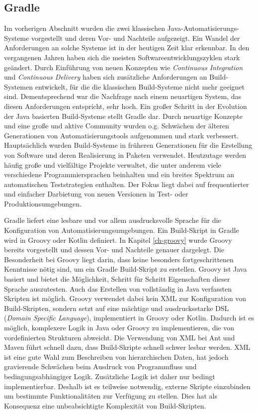 \subsection{Gradle}
Im vorherigen Abschnitt wurden die zwei klassischen Java-Automatisierungs-Systeme vorgestellt und deren Vor- und Nachteile aufgezeigt.
Ein Wandel der Anforderungen an solche Systeme ist in der heutigen Zeit klar erkennbar.
In den vergangenen Jahren haben sich die meisten Softwareentwicklungszyklen stark geändert. 
Durch Einführung von neuen Konzepten wie \textit{Continuous Integration} und \textit{Continuous Delivery} haben sich zusätzliche Anforderungen an Build-Systemen entwickelt, für die die klassischen Build-Systeme nicht mehr geeignet sind. 
Dementsprechend war die Nachfrage nach einem neuartigen System, das diesen Anforderungen entspricht, sehr hoch. 
Ein großer Schritt in der Evolution der Java basierten Build-Systeme stellt Gradle dar.
Durch neuartige Konzepte und eine große und aktive Community wurden o.g. Schwächen der älteren Generationen von Automatisierungstools aufgenommen und stark verbessert.
Hauptsächlich wurden Build-Systeme in früheren Generationen für die Erstellung von Software und deren Realisierung in Paketen verwendet.
Heutzutage werden häufig große und vielfältige Projekte verwaltet, die unter anderem viele verschiedene Programmiersprachen beinhalten und ein breites Spektrum an automatischen Teststrategien enthalten. 
Der Fokus liegt dabei auf frequentierter und einfacher Darbietung von neuen Versionen in Test- oder Produktionsumgebungen. 

Gradle liefert eine lesbare und vor allem ausdrucksvolle Sprache für die Konfiguration von Automatisierungsumgebungen.
Ein Build-Skript in Gradle wird in Groovy oder Kotlin definiert. 
In Kapitel \ref{ch-groovy} wurde Groovy bereits vorgestellt und dessen Vor- und Nachteile genauer dargelegt. 
Die Besonderheit bei Groovy liegt darin, dass keine besonders fortgeschrittenen Kenntnisse nötig sind, um ein Gradle Build-Skript zu erstellen.
Groovy ist Java basiert und bietet die Möglichkeit, Schritt für Schritt Eigenschaften dieser Sprache auszutesten.
Auch das Erstellen von vollständig in Java verfassten Skripten ist möglich. 
Groovy verwendet dabei kein XML zur Konfiguration von Build-Skripten, sondern setzt auf eine mächtige und ausdrucksstarke DSL (\textit{Domain Specific Language}), implementiert in Groovy oder Kotlin. 
Dadurch ist es möglich, komplexere Logik in Java oder Groovy zu implementieren, die von vordefinierten Strukturen abweicht.
Die Verwendung von XML bei Ant und Maven führt schnell dazu, dass Build-Skripte schnell schwer lesbar werden. 
XML ist eine gute Wahl zum Beschreiben von hierarchischen Daten, hat jedoch gravierende Schwächen beim Ausdruck von Programmfluss und bedingungsabhängiger Logik. 
Zusätzliche Logik ist daher nur bedingt implementierbar.
Deshalb ist es teilweise notwendig, externe Skripte einzubinden um bestimmte Funktionalitäten zur Verfügung zu stellen.
Dies hat als Konsequenz eine unbeabsichtigte Komplexität von Build-Skripten.

